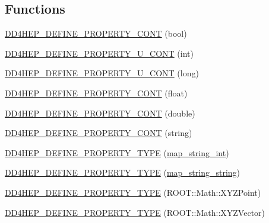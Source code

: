 \subsection*{Functions}
\begin{DoxyCompactItemize}
\item 
\hyperlink{namespace_d_d4hep_a2a12fc15eee252853c7dae0c8c10289c}{D\+D4\+H\+E\+P\+\_\+\+D\+E\+F\+I\+N\+E\+\_\+\+P\+R\+O\+P\+E\+R\+T\+Y\+\_\+\+C\+O\+NT} (bool)
\item 
\hyperlink{namespace_d_d4hep_a46bcfee20ed1f70d5d76b01a58a17a6d}{D\+D4\+H\+E\+P\+\_\+\+D\+E\+F\+I\+N\+E\+\_\+\+P\+R\+O\+P\+E\+R\+T\+Y\+\_\+\+U\+\_\+\+C\+O\+NT} (int)
\item 
\hyperlink{namespace_d_d4hep_a67e8fcf00713a100e27262956cfd4531}{D\+D4\+H\+E\+P\+\_\+\+D\+E\+F\+I\+N\+E\+\_\+\+P\+R\+O\+P\+E\+R\+T\+Y\+\_\+\+U\+\_\+\+C\+O\+NT} (long)
\item 
\hyperlink{namespace_d_d4hep_ae9ef794f55e34dba969074941408b572}{D\+D4\+H\+E\+P\+\_\+\+D\+E\+F\+I\+N\+E\+\_\+\+P\+R\+O\+P\+E\+R\+T\+Y\+\_\+\+C\+O\+NT} (float)
\item 
\hyperlink{namespace_d_d4hep_ad408fcdf0daa5ec52a5a1dbfbf211eb4}{D\+D4\+H\+E\+P\+\_\+\+D\+E\+F\+I\+N\+E\+\_\+\+P\+R\+O\+P\+E\+R\+T\+Y\+\_\+\+C\+O\+NT} (double)
\item 
\hyperlink{namespace_d_d4hep_ab33d2c119234589fde3ac44efa5d2fbc}{D\+D4\+H\+E\+P\+\_\+\+D\+E\+F\+I\+N\+E\+\_\+\+P\+R\+O\+P\+E\+R\+T\+Y\+\_\+\+C\+O\+NT} (string)
\item 
\hyperlink{namespace_d_d4hep_ade11f09970354c220f7e06750e6612f1}{D\+D4\+H\+E\+P\+\_\+\+D\+E\+F\+I\+N\+E\+\_\+\+P\+R\+O\+P\+E\+R\+T\+Y\+\_\+\+T\+Y\+PE} (\hyperlink{namespace_d_d4hep_a5d68f9c863a419d5ed00cc08b473e352}{map\+\_\+string\+\_\+int})
\item 
\hyperlink{namespace_d_d4hep_aca0c6b3f7707ee1db826428abeb139c2}{D\+D4\+H\+E\+P\+\_\+\+D\+E\+F\+I\+N\+E\+\_\+\+P\+R\+O\+P\+E\+R\+T\+Y\+\_\+\+T\+Y\+PE} (\hyperlink{namespace_d_d4hep_a0f6ae5793bad82d7e3c5a6fd76334cf1}{map\+\_\+string\+\_\+string})
\item 
\hyperlink{namespace_d_d4hep_a622b20d2110955cfac58aee38d3d2f62}{D\+D4\+H\+E\+P\+\_\+\+D\+E\+F\+I\+N\+E\+\_\+\+P\+R\+O\+P\+E\+R\+T\+Y\+\_\+\+T\+Y\+PE} (R\+O\+O\+T\+::\+Math\+::\+X\+Y\+Z\+Point)
\item 
\hyperlink{namespace_d_d4hep_a837feac073c4437c1df965f9a8fb768e}{D\+D4\+H\+E\+P\+\_\+\+D\+E\+F\+I\+N\+E\+\_\+\+P\+R\+O\+P\+E\+R\+T\+Y\+\_\+\+T\+Y\+PE} (R\+O\+O\+T\+::\+Math\+::\+X\+Y\+Z\+Vector)
\item 

\end{DoxyCompactItemize}
